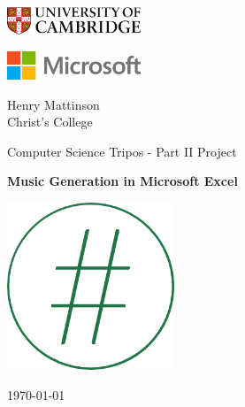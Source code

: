 %
%

\begin{titlepage}
	\noindent
	\begin{minipage}[t][][t]{0.329\textwidth}
    \begin{flushleft}
		\includegraphics[width=40mm]{figs/cam.jpg}
  \end{flushleft}
	\end{minipage}
  \begin{minipage}[t][][t]{0.329\textwidth}
    \begin{center}
    \includegraphics[width=40mm]{figs/microsoft.png}
  \end{center}
	\end{minipage}
	\begin{minipage}{0.329\textwidth}
	\begin{flushright}
    \vspace{-8pt}
		\large Henry Mattinson \\
		Christ's College
	\end{flushright}
	\end{minipage}

	\begin{center}
	\vspace{6cm}
	{\sc\large Computer Science Tripos - Part II Project\par}
	\vspace{0.5cm}
	{\huge\bf Music Generation in Microsoft Excel\par}
  \vspace{0.8cm}
  {\includegraphics[width=50mm]{figs/excelloLogoRing.png} \par}
  \vspace{0.5cm}
	{\large \today \par}
	\end{center}

\end{titlepage}
